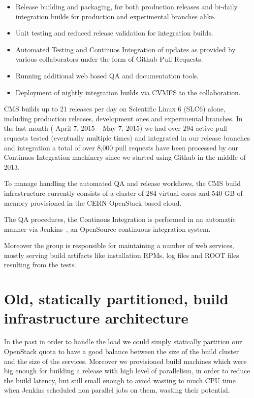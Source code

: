 \documentclass[a4paper]{jpconf}
\begin{document}
\begin{itemize}

\item Release building and packaging, for both production releases and bi-daily
integration builds for production and experimental branches alike.

\item Unit testing and reduced release validation for integration builds.

\item Automated Testing and Continuos Integration of updates as provided by
various collaborators under the form of Github Pull Requests.

\item Running additional web based QA and documentation tools.

\item Deployment of nightly integration builds via CVMFS to the collaboration.

\end{itemize}

CMS builds up to 21 releases per day on Scientific Linux 6 (SLC6) alone,
including production releases, development ones and experimental branches. In
the last month ( April 7, 2015 – May 7, 2015) we had over 294 active pull
requests tested (eventually multiple times) and integrated in our release
branches and integration a total of over 8,000 pull requests have been processed
by our Continuos Integration machinery since we started using Github in the
middle of 2013.~\cite{Eulisse2014}

To manage handling the automated QA and release workflows, the CMS build
infrastructure currently consists of a cluster of 284 virtual cores and 540 GB
of memory provisioned in the CERN OpenStack based cloud.~\cite{CERNOPENSTACK}

The QA procedures, the Continous Integration is performed in an automatic manner
via Jenkins~\cite{JENKINS}, an OpenSource continuous integration system.

Moreover the group is responsible for maintaining a number of web services,
mostly serving build artifacts like installation RPMs, log files and ROOT files
resulting from the tests.

\section{Old, statically partitioned, build infrastructure architecture}

In the past in order to handle the load we could simply statically partition our
OpenStack quota to have a good balance between the size of the build cluster and
the size of the services. Moreover we provisioned build machines which were big
enough for building a release with high level of parallelism, in order to reduce
the build latency, but still small enough to avoid wasting to much CPU time when
Jenkins scheduled non parallel jobs on them, wasting their potential.
\end{document}
